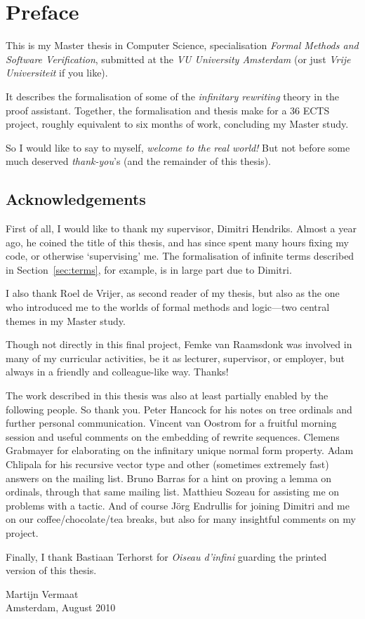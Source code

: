\chapter*{Preface}
\thispagestyle{empty}

This is my Master thesis in Computer Science,
specialisation \emph{Formal Methods and Software Verification},
submitted at the \emph{VU University Amsterdam} (or just \emph{Vrije
  Universiteit} if you like).

It describes the formalisation of some of the \emph{infinitary
  rewriting} theory in the \Coq proof assistant.
Together, the formalisation and thesis make
for a 36 ECTS project, roughly equivalent to six months of work,
concluding my Master study.

So I would like to say to myself, \emph{welcome to the real world!}
But not before some much deserved \emph{thank-you}'s (and the
remainder of this thesis).


\section*{Acknowledgements}

First of all, I would like to thank my supervisor, Dimitri
Hendriks. Almost a year ago, he coined the title of this thesis, and
has since spent many hours fixing my \Coq code, or otherwise
`supervising' me. The formalisation of infinite terms described in
Section~\ref{sec:terms}, for example, is in large part due to
Dimitri.

I also thank Roel de Vrijer, as second reader of my thesis, but also
as the one who introduced me to the worlds of formal methods and
logic---two central themes in my Master study.

Though not directly in this final project, Femke van Raamsdonk was
involved in many of my curricular activities, be it as lecturer,
supervisor, or employer, but always in a friendly and colleague-like
way. Thanks!

The work described in this thesis was also at least partially enabled
by the following people. So thank you. Peter Hancock for his notes on
tree ordinals and further personal communication. Vincent van Oostrom
for a fruitful morning session and useful comments on the embedding of
rewrite sequences. Clemens Grabmayer for elaborating on the infinitary
unique normal form property. Adam Chlipala for his recursive vector type and
other (sometimes extremely fast) answers on the \Coq mailing
list. Bruno Barras for a hint on proving a lemma on ordinals, through
that same mailing list. Matthieu Sozeau for assisting me on problems
with a \Coq tactic. And of course J\"org Endrullis for joining Dimitri
and me on our coffee/chocolate/tea breaks, but also for many insightful
comments on my project.

Finally, I thank Bastiaan Terhorst for \emph{Oiseau d'infini} guarding
the printed version of this thesis.


\thispagestyle{empty}

\begin{flushright}
  Martijn Vermaat\\
  Amsterdam, August 2010
\end{flushright}
